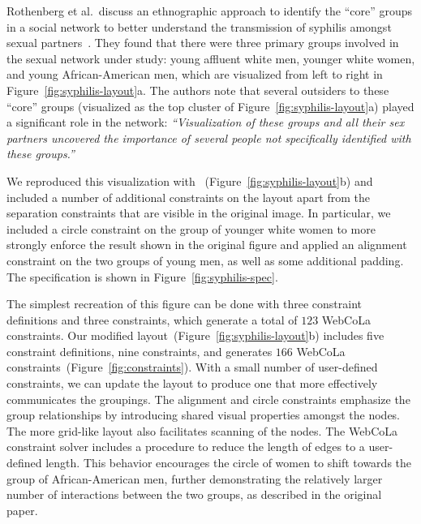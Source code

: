 Rothenberg et al.\ discuss an ethnographic approach to identify the
``core'' groups in a social network to better understand the transmission
of syphilis amongst sexual partners~\cite{rothenberg1998using}. They found
that there were three primary groups involved in the sexual network under study:
young affluent white men, younger white women, and young African-American men,
which are visualized from left to right in Figure~\ref{fig:syphilis-layout}a. 
The authors note that several outsiders to these ``core'' groups
(visualized as the top cluster of Figure~\ref{fig:syphilis-layout}a) 
played a significant role in the network:
\emph{``Visualization of these groups and all their sex
  partners uncovered the importance of several people not specifically
  identified with these groups.''}

We reproduced this visualization with \projectname~(Figure~\ref{fig:syphilis-layout}b) 
and included a number of additional constraints on the layout apart
from the separation constraints that are visible in the original image. In
particular, we included a circle constraint on the group of younger white
women to more strongly enforce the result shown in the original figure and
applied an alignment constraint on the two groups of young
men, as well as some additional padding. The \projectname specification
is shown in Figure~\ref{fig:syphilis-spec}.

The simplest recreation of this figure can be done with three constraint
definitions and three \projectname constraints, which generate a total of
$123$ WebCoLa constraints.
Our modified layout~(Figure~\ref{fig:syphilis-layout}b) includes 
five constraint definitions, nine \projectname constraints, and generates 
$166$ WebCoLa constraints~(Figure~\ref{fig:constraints}). With a small 
number of user-defined constraints, we can update the layout to produce
one that more effectively communicates the groupings. The
alignment and circle constraints emphasize the group relationships by
introducing shared visual properties amongst the nodes. The more grid-like
layout also facilitates scanning of the nodes. The
WebCoLa constraint solver includes a procedure to reduce the length of
edges to a user-defined length. This behavior encourages the circle of women
to shift towards the group of African-American men, further demonstrating
the relatively larger number of interactions between the two groups,
as described in the original paper.

